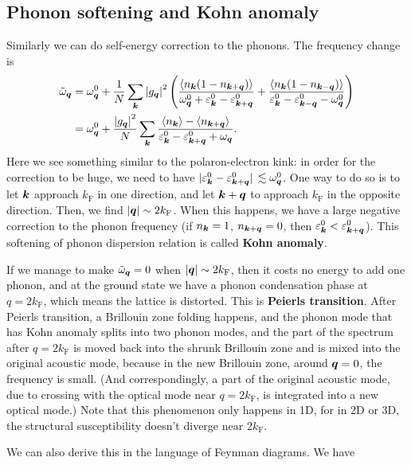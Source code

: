 \documentclass[hyperref, a4paper]{article}
\newcommand*{\concept}[1]{{\textbf{#1}}}
\begin{document}
\subsection{Phonon softening and Kohn anomaly}

Similarly we can do self-energy correction to the phonons.
The frequency change is 
\begin{equation}
    \begin{aligned}
        \tilde{\omega}_{\vb*{q}} &= \omega^0_{\vb*{q}} + \frac{1}{N} \sum_{\vb*{k}} \abs{g_{\vb*{q}}}^2 \left(
            \frac{\expval{n_{\vb*{k}} (1 - n_{\vb*{k} + \vb*{q}})}}{\omega^0_{\vb*{q}} + \varepsilon^0_{\vb*{k}} - \varepsilon^0_{\vb*{k} + \vb*{q}}}
            + \frac{\expval{n_{\vb*{k}} (1 - n_{\vb*{k} - \vb*{q}})}}{\varepsilon^0_{\vb*{k}} - \varepsilon^0_{\vb*{k} - \vb*{q}} - \omega^0_{\vb*{q}}}
        \right) \\
        &= \omega^0_{\vb*{q}} + \frac{\abs{g_{\vb*{q}}}^2}{N} \sum_{\vb*{k}} 
        \frac{\expval{n_{\vb*{k}}} - \expval{n_{\vb*{k} + \vb*{q}}}}{\varepsilon^0_{\vb*{k}} - \varepsilon^0_{\vb*{k} + \vb*{q}} + \omega_{\vb*{q}}}.
    \end{aligned}
\end{equation}
Here we see something similar to the polaron-electron kink:
in order for the correction to be huge, 
we need to have $\abs*{\varepsilon^0_{\vb*{k}} - \varepsilon^0_{\vb*{k} + \vb*{q}}} \lesssim \omega^0_{\vb*{q}}$.
One way to do so is to let $\vb*{k}$ approach $k_\text{F}$ in one direction,
and let $\vb*{k} + \vb*{q}$ to approach $k_{\text{F}}$ in the opposite direction.
Then, we find $\abs{\vb*{q}} \sim 2 k_{\text{F}}$.
When this happens, we have a large negative correction to the phonon frequency 
(if $n_{\vb*{k}} = 1$, $n_{\vb*{k} + \vb*{q}} = 0$, then $\varepsilon^0_{\vb*{k}} < \varepsilon^0_{\vb*{k} + \vb*{q}}$).
This softening of phonon dispersion relation 
is called \concept{Kohn anomaly}.

If we manage to make $\tilde{\omega}_{\vb*{q}} = 0$ when $\abs{\vb*{q}} \sim 2 k_{\text{F}}$,
then it costs no energy to add one phonon, 
and at the ground state we have a phonon condensation phase at $q = 2 k_{\text{F}}$,
which means the lattice is distorted.
This is \concept{Peierls transition}.
After Peierls transition, a Brillouin zone folding happens, 
and the phonon mode that has Kohn anomaly 
splits into two phonon modes, 
and the part of the spectrum after $q = 2 k_{\text{F}}$
is moved back into the shrunk Brillouin zone 
and is mixed into the original acoustic mode,
because in the new Brillouin zone, 
around $\vb*{q} = 0$, the frequency is small.
(And correspondingly, a part of the original acoustic mode, 
due to crossing with the optical mode near $q = 2 k_{\text{F}}$,
is integrated into a new optical mode.)
Note that this phenomenon only happens in 1D, 
for in 2D or 3D, the structural susceptibility 
doesn't diverge near $2 k_{\text{F}}$.

We can also derive this in the language of Feynman diagrams.
We have 
\end{document}
